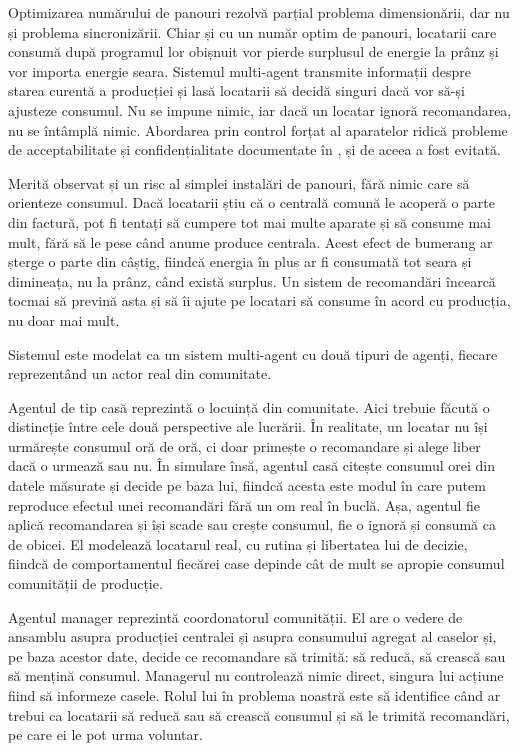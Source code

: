 \documentclass[12pt,a4paper]{report}
\begin{document}
Optimizarea numărului de panouri rezolvă parțial problema dimensionării, dar nu și problema sincronizării. Chiar și cu un număr optim de panouri, locatarii care consumă după programul lor obișnuit vor pierde surplusul de energie la prânz și vor importa energie seara. Sistemul multi-agent transmite informații despre starea curentă a producției și lasă locatarii să decidă singuri dacă vor să-și ajusteze consumul. Nu se impune nimic, iar dacă un locatar ignoră recomandarea, nu se întâmplă nimic. Abordarea prin control forțat al aparatelor ridică probleme de acceptabilitate și confidențialitate documentate în \cite{simoiu2022renewable}, și de aceea a fost evitată.

Merită observat și un risc al simplei instalări de panouri, fără nimic care să orienteze consumul. Dacă locatarii știu că o centrală comună le acoperă o parte din factură, pot fi tentați să cumpere tot mai multe aparate și să consume mai mult, fără să le pese când anume produce centrala. Acest efect de bumerang ar șterge o parte din câștig, fiindcă energia în plus ar fi consumată tot seara și dimineața, nu la prânz, când există surplus. Un sistem de recomandări încearcă tocmai să prevină asta și să îi ajute pe locatari să consume în acord cu producția, nu doar mai mult.

Sistemul este modelat ca un sistem multi-agent cu două tipuri de agenți, fiecare reprezentând un actor real din comunitate.

Agentul de tip casă reprezintă o locuință din comunitate. Aici trebuie făcută o distincție între cele două perspective ale lucrării. În realitate, un locatar nu își urmărește consumul oră de oră, ci doar primește o recomandare și alege liber dacă o urmează sau nu. În simulare însă, agentul casă citește consumul orei din datele măsurate și decide pe baza lui, fiindcă acesta este modul în care putem reproduce efectul unei recomandări fără un om real în buclă. Așa, agentul fie aplică recomandarea și își scade sau crește consumul, fie o ignoră și consumă ca de obicei. El modelează locatarul real, cu rutina și libertatea lui de decizie, fiindcă de comportamentul fiecărei case depinde cât de mult se apropie consumul comunității de producție.

Agentul manager reprezintă coordonatorul comunității. El are o vedere de ansamblu asupra producției centralei și asupra consumului agregat al caselor și, pe baza acestor date, decide ce recomandare să trimită: să reducă, să crească sau să mențină consumul. Managerul nu controlează nimic direct, singura lui acțiune fiind să informeze casele. Rolul lui în problema noastră este să identifice când ar trebui ca locatarii să reducă sau să crească consumul și să le trimită recomandări, pe care ei le pot urma voluntar.
\end{document}
